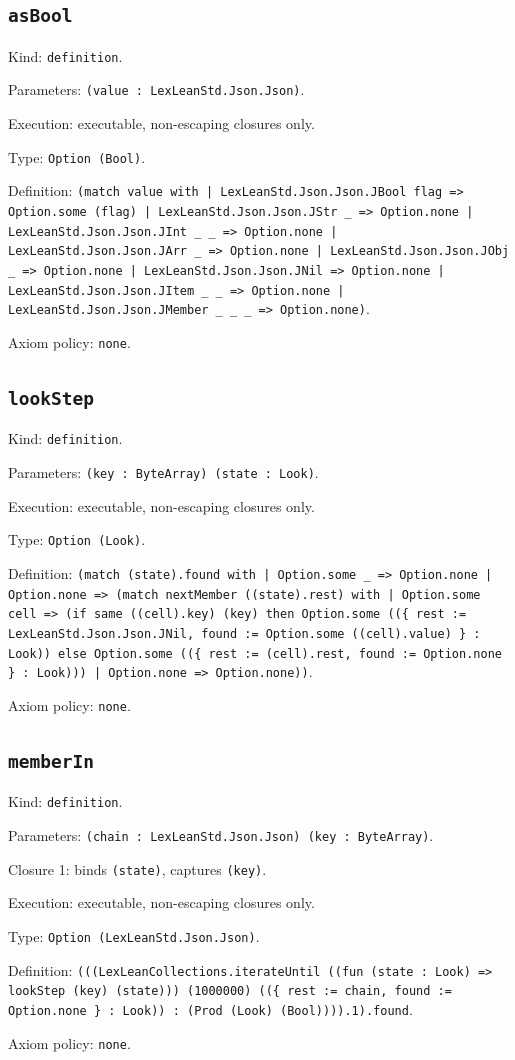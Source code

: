 \documentclass[11pt]{article}
\begin{document}
\subsection*{\texttt{asBool}}
\noindent Kind: \texttt{definition}.\par
\noindent Parameters: \texttt{(value : LexLeanStd.Json.Json)}.\par
\noindent Execution: executable, non-escaping closures only.\par
\noindent Type: \texttt{Option (Bool)}.\par
\noindent Definition: \texttt{(match value with | LexLeanStd.Json.Json.JBool flag => Option.some (flag) | LexLeanStd.Json.Json.JStr \_ => Option.none | LexLeanStd.Json.Json.JInt \_ \_ => Option.none | LexLeanStd.Json.Json.JArr \_ => Option.none | LexLeanStd.Json.Json.JObj \_ => Option.none | LexLeanStd.Json.Json.JNil => Option.none | LexLeanStd.Json.Json.JItem \_ \_ => Option.none | LexLeanStd.Json.Json.JMember \_ \_ \_ => Option.none)}.\par
\noindent Axiom policy: \texttt{none}.\par
\subsection*{\texttt{lookStep}}
\noindent Kind: \texttt{definition}.\par
\noindent Parameters: \texttt{(key : ByteArray) (state : Look)}.\par
\noindent Execution: executable, non-escaping closures only.\par
\noindent Type: \texttt{Option (Look)}.\par
\noindent Definition: \texttt{(match (state).found with | Option.some \_ => Option.none | Option.none => (match nextMember ((state).rest) with | Option.some cell => (if same ((cell).key) (key) then Option.some ((\{ rest := LexLeanStd.Json.Json.JNil, found := Option.some ((cell).value) \} : Look)) else Option.some ((\{ rest := (cell).rest, found := Option.none \} : Look))) | Option.none => Option.none))}.\par
\noindent Axiom policy: \texttt{none}.\par
\subsection*{\texttt{memberIn}}
\noindent Kind: \texttt{definition}.\par
\noindent Parameters: \texttt{(chain : LexLeanStd.Json.Json) (key : ByteArray)}.\par
\noindent Closure 1: binds \texttt{(state)}, captures \texttt{(key)}.\par
\noindent Execution: executable, non-escaping closures only.\par
\noindent Type: \texttt{Option (LexLeanStd.Json.Json)}.\par
\noindent Definition: \texttt{(((LexLeanCollections.iterateUntil ((fun (state : Look) => lookStep (key) (state))) (1000000) ((\{ rest := chain, found := Option.none \} : Look)) : (Prod (Look) (Bool)))).1).found}.\par
\noindent Axiom policy: \texttt{none}.\par
\end{document}
